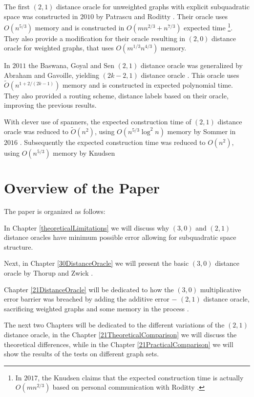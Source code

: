 \documentclass[shortabstract, lic, english]{iithesis}
\theoremstyle{definition} \newtheorem{definition}{Definition}[chapter]
\theoremstyle{plain} \newtheorem{remark}[definition]{Observation}
\theoremstyle{plain} \newtheorem{theorem}[definition]{Theorem}
\theoremstyle{plain} \newtheorem{lemma}[definition]{Lemma}
\theoremstyle{plain} \newtheorem{conjecture}[definition]{Conjecture}
\begin{document}
The first $(2,1)$ distance oracle for unweighted graphs with explicit subquadratic space was constructed in $2010$ by Patrascu and Roditty \cite{21OracleLessMemory}.
Their oracle uses $O(n^{5/3})$ memory and is constructed in $O(mn^{2/3} + n^{7/3})$ expected time
\footnote{In $2017$, the Knudsen claims that the expected construction time is actually $O(mn^{2/3})$ based on personal communication with Roditty \cite[Chapter 4, Lemma 10]{21OracleSpannerNoPenaltyNoLog}.}.
They also provide a modification for their oracle resulting in $(2,0)$ distance oracle for weighted graphs, that uses $O(m^{1/3}n^{4/3})$ memory.

In $2011$ the Baswana, Goyal and Sen $(2,1)$ distance oracle was generalized by Abraham and Gavoille, yielding $(2k-2, 1)$ distance oracle \cite{a1Oracle}.
This oracle uses $\tilde{O}(n^{1 + 2/(2k-1)})$ memory and is constructed in expected polynomial time.
They also provided a routing scheme, distance labels based on their oracle, improving the previous results.

With clever use of spanners, the expected construction time of $(2,1)$ distance oracle was reduced to $\tilde{O}(n^2)$, using $O(n^{5/3}\log ^2 n)$ memory by Sommer in $2016$ \cite{21OracleSpannerNoPenalty}.
Subsequently the expected construction time was reduced to $O(n^2)$, using $O(n^{5/3})$ memory by Knudsen \cite{21OracleSpannerNoPenaltyNoLog}

\section{Overview of the Paper}
The paper is organized as follows:

In Chapter \ref{theoreticalLimitations} we will discuss why $(3,0)$ and $(2,1)$ distance oracles
have minimum possible error allowing for subquadratic space structure.

Next, in Chapter \ref{30DistanceOracle} we will present the basic $(3,0)$ distance oracle by Thorup and Zwick \cite{a0OraclesBasic}.

Chapter \ref{21DistanceOracle} will be dedicated to how the $(3,0)$ multiplicative error barrier was breached by adding the additive error $-$
$(2,1)$ distance oracle, sacrificing weighted graphs and some memory in the process \cite{21OracleBasic}.

The next two Chapters will be dedicated to the different variations of the $(2,1)$ distance oracle,
in the Chapter \ref{21TheoreticalComparison} we will discuss the theoretical differences,
while in the Chapter \ref{21PracticalComparison} we will show the results of the tests on different graph sets.
\end{document}

